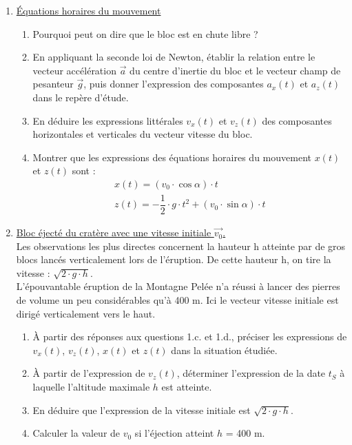 \documentclass[a4paper,12pt]{article}
\begin{document}
\begin{enumerate}
	\item \underline{Équations horaires du mouvement}
	\begin{enumerate}
		\item Pourquoi peut on dire que le bloc est en chute libre ?
		\item En appliquant la seconde loi de Newton, établir la relation entre le vecteur accélération $\vec{a}$ du centre d’inertie du bloc et le vecteur champ de pesanteur $\vec{g}$, puis donner l’expression des composantes $a_x(t)$ et $a_z(t)$ dans le repère d’étude.
		\item En déduire les expressions littérales $v_x(t)$ et $v_z(t)$ des composantes horizontales et verticales du vecteur vitesse du bloc.
		\item Montrer que les expressions des équations horaires du mouvement $x(t)$ et $z(t)$ sont : 
		\begin{eqnarray}
		x(t) = (v_0 \cdot \cos{\alpha})\cdot t \nonumber \\
		z(t) = -\dfrac{1}{2} \cdot g \cdot t^2 + (v_0 \cdot \sin{\alpha}) \cdot t \nonumber
		\end{eqnarray}
	\end{enumerate}
	\item \underline{Bloc éjecté du cratère avec une vitesse initiale $\vec{v_0}$.}\\
	Les observations les plus directes concernent la hauteur h atteinte par de gros blocs lancés verticalement lors de l’éruption. De cette hauteur h, on tire la vitesse : $\sqrt{2 \cdot g \cdot h}$.\\
L’épouvantable éruption de la Montagne Pelée n’a réussi à lancer des pierres de volume un peu considérables qu’à 400 m. Ici le vecteur vitesse initiale est dirigé verticalement vers le haut.
	\begin{enumerate}
		\item À partir des réponses aux questions 1.c. et 1.d., préciser les expressions de $v_x(t)$, $v_z(t)$, $x(t)$ et $z(t)$ dans la situation étudiée.
		\item À partir de l'expression de $v_z(t)$, déterminer l'expression de la date $t_S$ à laquelle l'altitude maximale $h$ est atteinte.
		\item En déduire que l'expression de la vitesse initiale est $\sqrt{2 \cdot g \cdot h}$.
		\item Calculer la valeur de $v_0$ si l'éjection atteint $h$ = \num{400} \unit{\meter}.
	\end{enumerate}
\end{enumerate}
\end{document}
